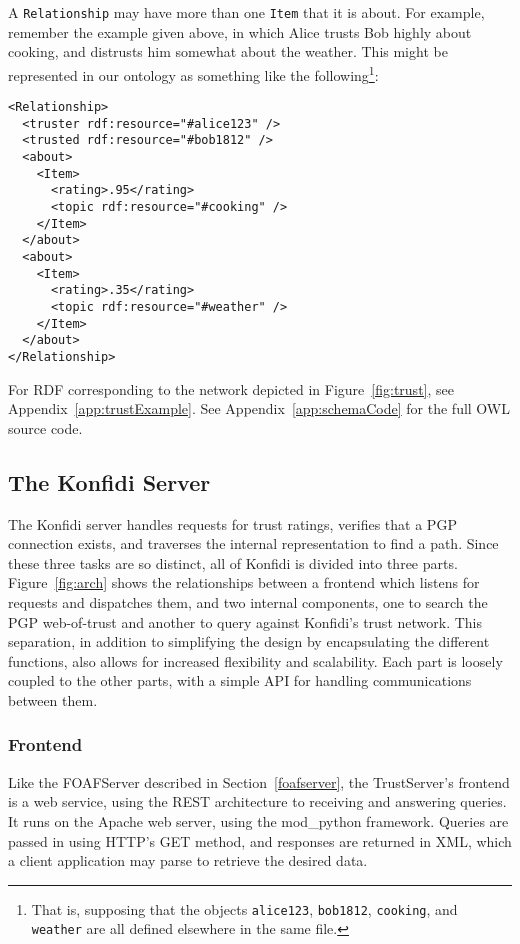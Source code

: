 \documentclass{acm_proc_article-sp}
\begin{document}
A \texttt{Relationship} may have more than one \texttt{Item} that it is about.  For example, remember the example given above, in which Alice trusts Bob highly about cooking, and distrusts him somewhat about the weather.  This might be represented in our ontology as something like the following\footnote{That is, supposing that the objects \texttt{alice123}, \texttt{bob1812}, \texttt{cooking}, and \texttt{weather} are all defined elsewhere in the same file.}:

\begin{verbatim}
<Relationship>
  <truster rdf:resource="#alice123" />
  <trusted rdf:resource="#bob1812" />
  <about>
    <Item>
      <rating>.95</rating>
      <topic rdf:resource="#cooking" />
    </Item>
  </about>
  <about>
    <Item>
      <rating>.35</rating>
      <topic rdf:resource="#weather" />
    </Item>
  </about>
</Relationship>
\end{verbatim}

For RDF corresponding to the network depicted in Figure~\ref{fig:trust}, see Appendix~\ref{app:trustExample}.  See Appendix~\ref{app:schemaCode} for the full OWL source code.  

\subsection{The Konfidi Server}
The Konfidi server handles requests for trust ratings, verifies that a PGP connection exists, and traverses the internal representation to find a path.  Since these three tasks are so distinct, all of Konfidi is divided into three parts.  Figure~\ref{fig:arch} shows the relationships between a frontend which listens for requests and dispatches them, and two internal components, one to search the PGP web-of-trust and another to query against Konfidi's trust network.  This separation, in addition to simplifying the design by encapsulating the different functions, also allows for increased flexibility and scalability.  Each part is loosely coupled to the other parts, with a simple API for handling communications between them.

\subsubsection{Frontend}
Like the FOAFServer described in Section~\ref{foafserver}, the TrustServer's frontend is a web service, using the REST architecture to receiving and answering queries. 
It runs on the Apache web server, using the mod\_python framework.  Queries are passed in using HTTP's GET method, and responses are returned in XML, which a client application may parse to retrieve the desired data.
\end{document}
